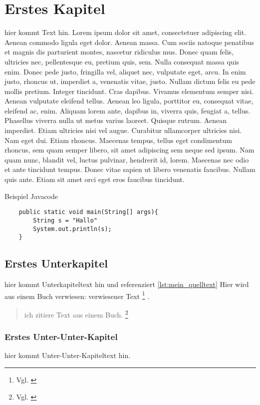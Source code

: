 \section{Erstes Kapitel}
hier kommt Text hin.
Lorem ipsum dolor sit amet, consectetuer adipiscing elit. Aenean commodo ligula eget dolor. Aenean massa. Cum sociis natoque penatibus et magnis dis parturient montes, nascetur ridiculus mus. Donec quam felis, ultricies nec, pellentesque eu, pretium quis, sem. Nulla consequat massa quis enim. Donec pede justo, fringilla vel, aliquet nec, vulputate eget, arcu. In enim justo, rhoncus ut, imperdiet a, venenatis vitae, justo. Nullam dictum felis eu pede mollis pretium. Integer tincidunt. Cras dapibus. Vivamus elementum semper nisi. Aenean vulputate eleifend tellus. Aenean leo ligula, porttitor eu, consequat vitae, eleifend ac, enim. Aliquam lorem ante, dapibus in, viverra quis, feugiat a, tellus. Phasellus viverra nulla ut metus varius laoreet. Quisque rutrum. Aenean imperdiet. Etiam ultricies nisi vel augue. Curabitur ullamcorper ultricies nisi. Nam eget dui. Etiam rhoncus. Maecenas tempus, tellus eget condimentum rhoncus, sem quam semper libero, sit amet adipiscing sem neque sed ipsum. Nam quam nunc, blandit vel, luctus pulvinar, hendrerit id, lorem. Maecenas nec odio et ante tincidunt tempus. Donec vitae sapien ut libero venenatis faucibus. Nullam quis ante. Etiam sit amet orci eget eros faucibus tincidunt.

\begin{listing}[H]
    \caption{Beispiel Javacode}
    \label{lst:mein_quelltext}
    \begin{verbatim}
    public static void main(String[] args){
        String s = "Hallo"
        System.out.println(s);
    }
    \end{verbatim}
\end{listing}

\subsection{Erstes Unterkapitel}
hier kommt Unterkapiteltext hin und referenziert \ref{lst:mein_quelltext} 
Hier wird aus einem Buch verwiesen: verwiesener Text \footnote{Vgl. \cite[S. 190]{teller1994visibility}} .
\begin{quote}
    ich zitiere Text aus einem Buch. \footnote{Vgl. \cite[S. 190]{wiki:Fußball}}
\end{quote}
\subsubsection{Erstes Unter-Unter-Kapitel}
hier kommt Unter-Unter-Kapiteltext hin.

